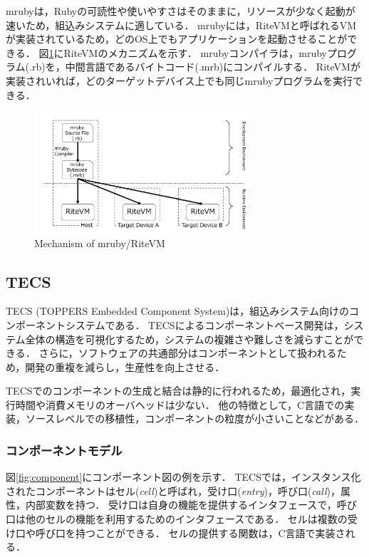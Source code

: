 \documentclass[submit]{ipsj_v2/UTF8/ipsj}
\begin{document}
mrubyは，Rubyの可読性や使いやすさはそのままに，リソースが少なく起動が速いため，組込みシステムに適している．
mrubyには，RiteVMと呼ばれるVMが実装されているため，どのOS上でもアプリケーションを起動させることができる．
図\ref{fig:mruby}にRiteVMのメカニズムを示す．
mrubyコンパイラは，mrubyプログラム(.rb)を，中間言語であるバイトコード(.mrb)にコンパイルする．
RiteVMが実装されいれば，どのターゲットデバイス上でも同じmrubyプログラムを実行できる．

\begin{figure}[t]
    \centering
    \includegraphics[width=8cm,clip]{../EMSOFT2016/figure/mruby.pdf}
    \caption{Mechanism of mruby/RiteVM}
    \label{fig:mruby}
\end{figure}

\subsection{TECS}
TECS (TOPPERS Embedded Component System)は，組込みシステム向けのコンポーネントシステムである．
TECSによるコンポーネントベース開発は，システム全体の構造を可視化するため，システムの複雑さや難しさを減らすことができる．
さらに，ソフトウェアの共通部分はコンポーネントとして扱われるため，開発の重複を減らし，生産性を向上させる．

TECSでのコンポーネントの生成と結合は静的に行われるため，最適化され，実行時間や消費メモリのオーバヘッドは少ない．
他の特徴として，C言語での実装，ソースレベルでの移植性，コンポーネントの粒度が小さいことなどがある．

\subsubsection{コンポーネントモデル}
図\ref{fig:component}にコンポーネント図の例を示す．
TECSでは，インスタンス化されたコンポーネントはセル({\it cell})と呼ばれ，受け口({\it entry})，呼び口({\it call})，属性，内部変数を持つ．
受け口は自身の機能を提供するインタフェースで，呼び口は他のセルの機能を利用するためのインタフェースである．
セルは複数の受け口や呼び口を持つことができる．
セルの提供する関数は，C言語で実装される．
\end{document}
